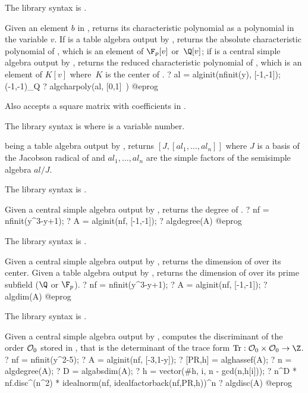 The library syntax is .

\label{se:algcharpoly}
Given an element $b$ in , returns its characteristic polynomial
as a polynomial in the variable $v$. If  is a table algebra output
by , returns the absolute characteristic polynomial of
, which is an element of $\F_p[v]$ or~$\Q[v]$; if  is a
central simple algebra output by , returns the reduced
characteristic polynomial of , which is an element of $K[v]$ where~$K$
is the center of .
\bprog
? al = alginit(nfinit(y), [-1,-1]); \\ (-1,-1)_Q
? algcharpoly(al, [0,1]~)
@eprog

Also accepts a square matrix with coefficients in .

The library syntax is  where  is a variable number.

\label{se:algdecomposition}
 being a table algebra output by , returns
$[J,[al_1,\dots,al_n]]$ where $J$ is a basis of the Jacobson radical of
 and $al_1,\dots,al_n$ are the simple factors of the semisimple
algebra $al/J$.

The library syntax is .

\label{se:algdegree}
Given a central simple algebra  output by , returns
the degree of .
\bprog
? nf = nfinit(y^3-y+1);
? A = alginit(nf, [-1,-1]);
? algdegree(A)
@eprog

The library syntax is .

\label{se:algdim}
Given a central simple algebra  output by , returns
the dimension of  over its center. Given a table algebra 
output by , returns the dimension of  over its prime
subfield ($\Q$ or $\F_p$).
\bprog
? nf = nfinit(y^3-y+1);
? A = alginit(nf, [-1,-1]);
? algdim(A)
@eprog

The library syntax is .

\label{se:algdisc}
Given a central simple algebra  output by , computes
the discriminant of the order ${\cal O}_0$ stored in , that is the
determinant of the trace form $\rm{Tr} : {\cal O}_0\times {\cal O}_0 \to \Z$.
\bprog
? nf = nfinit(y^2-5);
? A = alginit(nf, [-3,1-y]);
? [PR,h] = alghassef(A);
? n = algdegree(A);
? D = algabsdim(A);
? h = vector(#h, i, n - gcd(n,h[i]));
? n^D * nf.disc^(n^2) * idealnorm(nf, idealfactorback(nf,PR,h))^n
? algdisc(A)
@eprog

